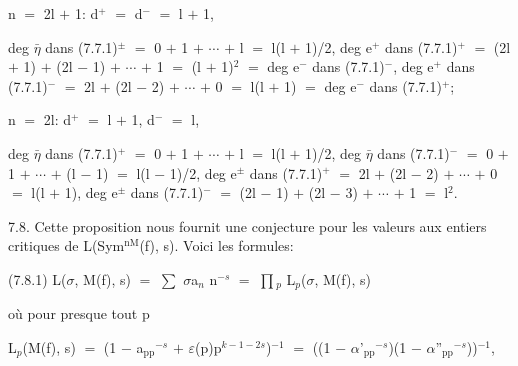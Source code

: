 \documentclass[10pt,twoside]{article}
\begin{document}
n \ensuremath{=} 2l \ensuremath{+} 1: d\ensuremath{^{+}} \ensuremath{=} d\ensuremath{^{-}} \ensuremath{=} l \ensuremath{+} 1,\par
deg \ensuremath{\bar{η}} dans (7.7.1)\ensuremath{^{±}} \ensuremath{=} 0 \ensuremath{+} 1 \ensuremath{+} \ensuremath{⋯} \ensuremath{+} l \ensuremath{=} l(l \ensuremath{+} 1)/2, deg e\ensuremath{^{+}} dans (7.7.1)\ensuremath{^{+}} \ensuremath{=} (2l \ensuremath{+} 1) \ensuremath{+} (2l \ensuremath{−} 1) \ensuremath{+} \ensuremath{⋯} \ensuremath{+} 1 \ensuremath{=} (l \ensuremath{+} 1)\ensuremath{^{2}} \ensuremath{=} deg e\ensuremath{^{-}} dans (7.7.1)\ensuremath{^{-}}, deg e\ensuremath{^{+}} dans (7.7.1)\ensuremath{^{-}} \ensuremath{=} 2l \ensuremath{+} (2l \ensuremath{−} 2) \ensuremath{+} \ensuremath{⋯} \ensuremath{+} 0 \ensuremath{=} l(l \ensuremath{+} 1) \ensuremath{=} deg e\ensuremath{^{-}} dans (7.7.1)\ensuremath{^{+}};\par
n \ensuremath{=} 2l: d\ensuremath{^{+}} \ensuremath{=} l \ensuremath{+} 1, d\ensuremath{^{-}} \ensuremath{=} l,\par
deg \ensuremath{\bar{η}} dans (7.7.1)\ensuremath{^{+}} \ensuremath{=} 0 \ensuremath{+} 1 \ensuremath{+} \ensuremath{⋯} \ensuremath{+} l \ensuremath{=} l(l \ensuremath{+} 1)/2, deg \ensuremath{\bar{η}} dans (7.7.1)\ensuremath{^{-}} \ensuremath{=} 0 \ensuremath{+} 1 \ensuremath{+} \ensuremath{⋯} \ensuremath{+} (l \ensuremath{−} 1) \ensuremath{=} l(l \ensuremath{−} 1)/2, deg e\ensuremath{^{±}} dans (7.7.1)\ensuremath{^{+}} \ensuremath{=} 2l \ensuremath{+} (2l \ensuremath{−} 2) \ensuremath{+} \ensuremath{⋯} \ensuremath{+} 0 \ensuremath{=} l(l \ensuremath{+} 1), deg e\ensuremath{^{±}} dans (7.7.1)\ensuremath{^{-}} \ensuremath{=} (2l \ensuremath{−} 1) \ensuremath{+} (2l \ensuremath{−} 3) \ensuremath{+} \ensuremath{⋯} \ensuremath{+} 1 \ensuremath{=} l\ensuremath{^{2}}.\par
7.8. Cette proposition nous fournit une conjecture pour les valeurs aux entiers critiques de L(Sym\ensuremath{^{\mathrm{nM}}}(f), s). Voici les formules:\par
(7.8.1)    L(\ensuremath{σ}, M(f), s) \ensuremath{=} \ensuremath{∑} \ensuremath{σ}a\ensuremath{_{n}} n\ensuremath{^{-s}} \ensuremath{=} \ensuremath{∏}\ensuremath{_{p}} L\ensuremath{_{p}}(\ensuremath{σ}, M(f), s)\par
où pour presque tout p\par
L\ensuremath{_{p}}(M(f), s) \ensuremath{=} (1 \ensuremath{−} a\ensuremath{_{\mathrm{pp}}}\ensuremath{^{-s}} \ensuremath{+} \ensuremath{ε}(p)p\ensuremath{^{k−1−2s}})\ensuremath{^{-1}} \ensuremath{=} ((1 \ensuremath{−} \ensuremath{α}'\ensuremath{_{\mathrm{pp}}}\ensuremath{^{-s}})(1 \ensuremath{−} \ensuremath{α}''\ensuremath{_{\mathrm{pp}}}\ensuremath{^{-s}}))\ensuremath{^{-1}},\par
\end{document}

